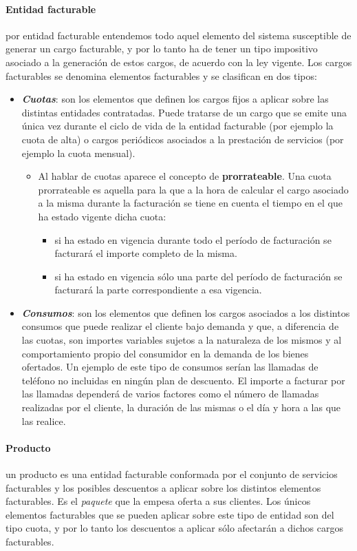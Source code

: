 \paragraph{Entidad facturable} por entidad facturable entendemos todo aquel elemento del sistema susceptible de generar un cargo facturable, y por lo tanto ha de tener un tipo impositivo asociado a la generación de estos cargos, de acuerdo con la ley vigente. Los cargos facturables se denomina elementos facturables y se clasifican en dos tipos:
\begin{itemize}
	\item \emph{\textbf{Cuotas}}: son los elementos que definen los cargos fijos a aplicar sobre las distintas entidades contratadas. Puede tratarse de un cargo que se emite una única vez durante el ciclo de vida de la entidad facturable (por ejemplo la cuota de alta) o cargos periódicos asociados a la prestación de servicios (por ejemplo la cuota mensual).
	\begin{itemize}
		\item Al hablar de cuotas aparece el concepto de \textbf{prorrateable}. Una cuota prorrateable es aquella para la que a la hora de calcular el cargo asociado a la misma durante la facturación se tiene en cuenta el tiempo en el que ha estado vigente dicha cuota: 
		\begin{itemize}
			\item si ha estado en vigencia durante todo el período de facturación se 		facturará el importe completo de la misma.
			\item si ha estado en vigencia sólo una parte del período de facturación se facturará la parte correspondiente a esa vigencia. 
		\end{itemize}
	\end{itemize}
	\item \emph{\textbf{Consumos}}: son los elementos que definen los cargos asociados a los distintos consumos que puede realizar el cliente bajo demanda y que, a diferencia de las cuotas, son importes variables sujetos a la naturaleza de los mismos y al comportamiento propio del consumidor en la demanda de los bienes ofertados. Un ejemplo de este tipo de consumos serían las llamadas de teléfono no incluidas en ningún plan de descuento. El importe a facturar por las llamadas dependerá de varios factores como el número de llamadas realizadas por el cliente, la duración de las mismas o el día y hora a las que las realice.
\end{itemize}


\paragraph{Producto} un producto es una entidad facturable conformada por el conjunto de servicios facturables y los posibles descuentos a aplicar sobre los distintos elementos facturables. Es el \textit{paquete} que la empesa oferta a sus clientes. Los únicos elementos facturables que se pueden aplicar sobre este tipo de entidad son del tipo cuota, y por lo tanto los descuentos a aplicar sólo afectarán a dichos cargos facturables.


